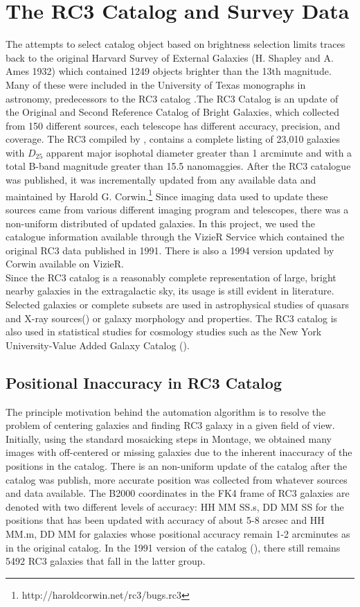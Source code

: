 \documentclass[5p]{elsarticle}
\begin{document}
\section{The RC3 Catalog and Survey Data}
The attempts to select catalog object based on brightness selection limits traces back to the original Harvard Survey of External Galaxies (H. Shapley and A. Ames 1932) which contained 1249 objects brighter than the 13th magnitude. Many of these were included in the University of Texas monographs in astronomy, predecessors to the  RC3 catalog .The RC3 Catalog is an update of the Original and Second Reference Catalog of Bright Galaxies, which collected from 150 different sources, each telescope has different accuracy, precision, and coverage. The RC3 compiled by \citet{rc3}, contains a  complete listing of 23,010 galaxies with $D_25$ apparent major isophotal diameter  greater than 1 arcminute and with a total B-band magnitude greater than 15.5 nanomaggies. After the RC3 catalogue was published, it was incrementally updated from any available data and maintained by Harold G. Corwin.\footnote{http://haroldcorwin.net/rc3/bugs.rc3} Since imaging data used to update these sources came from various different imaging program and telescopes, there was a non-uniform distributed of updated galaxies. In this project, we used the catalogue information available through the VizieR Service  which contained the original  RC3 data published in 1991. There is also a 1994 version updated by Corwin available on VizieR. 
\\
\indent  Since the RC3 catalog  is a reasonably complete representation of large, bright nearby galaxies in the extragalactic sky, its usage is still evident in literature. Selected galaxies or complete subsets are used in astrophysical studies of  quasars and X-ray sources(\citet{xray}) or  galaxy morphology and properties.  The RC3 catalog is also used in statistical studies  for cosmology studies such as the New York University-Value Added Galaxy Catalog (\citet{nyuvagc}).
\subsection{Positional Inaccuracy in RC3 Catalog}
	\label{sec:position}
	The principle motivation behind the automation algorithm is to resolve the problem of centering galaxies and finding RC3 galaxy in a given field of view. Initially, using the standard mosaicking steps in Montage, we obtained many images with  off-centered or missing galaxies due to the inherent inaccuracy of the positions in the catalog. There is an non-uniform update of the catalog after the catalog was publish, more accurate position was collected from whatever sources and data available. The B2000 coordinates in the FK4 frame of  RC3 galaxies are denoted with two different levels of accuracy: HH MM SS.s, DD MM SS for the positions that has been updated  with accuracy of about 5-8 arcsec and  HH MM.m, DD MM for galaxies whose positional accuracy remain  1-2 arcminutes as in the original catalog.  In the 1991 version of the catalog (\citet{rc31991}), there still remains 5492 RC3 galaxies that fall in the latter group.
\end{document}

